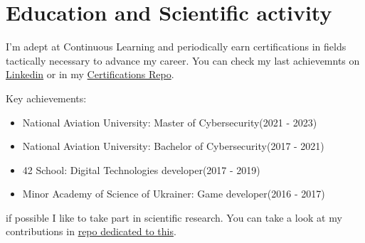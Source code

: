 \section{Education and Scientific activity}

I'm adept at Continuous Learning and periodically earn certifications in fields
tactically necessary to advance my career. You can check my last achievemnts on
\href{https://www.linkedin.com/in/dkushchevskyi/}{Linkedin} or in my
\href{https://github.com/dkushche/Certifications}{Certifications Repo}.

\vintent

Key achievements:
\begin{itemize}
    \item National Aviation University: Master of Cybersecurity\hspace*{\fill}(2021 - 2023)
    \item National Aviation University: Bachelor of Cybersecurity\hspace*{\fill}(2017 - 2021)
    \item 42 School: Digital Technologies developer\hspace*{\fill}(2017 - 2019)
    \item Minor Academy of Science of Ukrainer: Game developer\hspace*{\fill}(2016 - 2017)
\end{itemize}

\vintent

if possible I like to take part in scientific research. You can take a look at my
contributions in \href{https://github.com/dkushche/Scientific_publications}{repo dedicated to this}.
